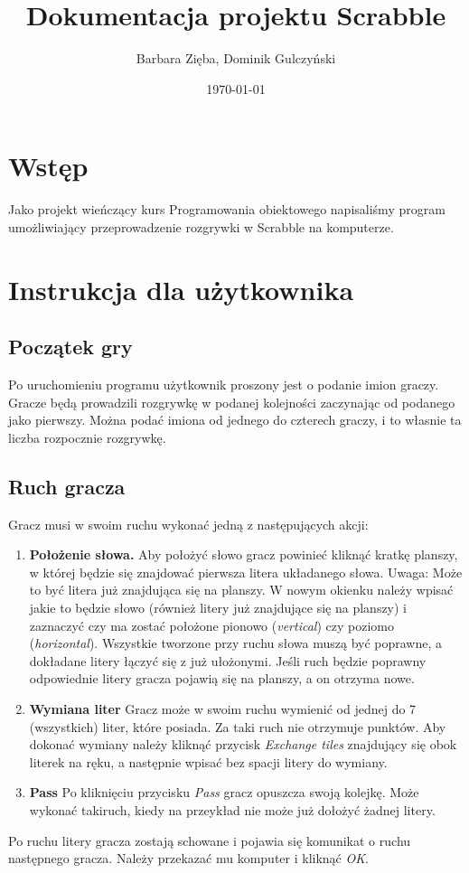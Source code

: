\documentclass[a4paper]{article}
\author{Barbara Zięba, Dominik Gulczyński}
\title{Dokumentacja projektu Scrabble}
\date{\today}
\begin{document}
\maketitle
\section{Wstęp}
Jako projekt wieńczący kurs Programowania obiektowego napisaliśmy
program umożliwiający przeprowadzenie rozgrywki w Scrabble na
komputerze.
\section{Instrukcja dla użytkownika}
\subsection{Początek gry}
Po uruchomieniu programu użytkownik proszony jest o podanie imion graczy. Gracze będą prowadzili rozgrywkę w podanej kolejności zaczynając od podanego jako pierwszy. Można podać imiona od jednego do czterech graczy, i to własnie ta liczba rozpocznie rozgrywkę.
\subsection{Ruch gracza}
Gracz musi w swoim ruchu wykonać jedną z następujących akcji:
\begin{enumerate}
\item[] \textbf{Położenie słowa.} 
Aby położyć słowo gracz powinieć kliknąć kratkę planszy, w której będzie się znajdować pierwsza litera układanego słowa. 
Uwaga: Może to być litera już znajdująca się na planszy.
W nowym okienku należy wpisać jakie to będzie słowo (również litery już znajdujące się na planszy)
i zaznaczyć czy ma zostać położone pionowo (\textit{vertical}) czy poziomo (\textit{horizontal}).
Wszystkie tworzone przy ruchu słowa muszą być poprawne, a dokładane litery łączyć się z już ułożonymi.
Jeśli ruch będzie poprawny odpowiednie litery gracza pojawią się na planszy, a on otrzyma nowe.
\item[] \textbf{Wymiana liter}
Gracz może w swoim ruchu wymienić od jednej do 7 (wszystkich) liter, które posiada.
Za taki ruch nie otrzymuje punktów. 
Aby dokonać wymiany należy kliknąć przycisk \textit{Exchange tiles} znajdujący się obok literek na ręku, a następnie wpisać bez spacji litery do wymiany.
\item[] \textbf{Pass}
Po kliknięciu przycisku \textit{Pass} gracz opuszcza swoją kolejkę.
Może wykonać takiruch, kiedy na przeykład nie może już dołożyć żadnej litery.
\end{enumerate}
Po ruchu litery gracza zostają schowane i pojawia się komunikat o ruchu następnego gracza.
Należy przekazać mu komputer i kliknąć \textit{OK}.
\end{document}

